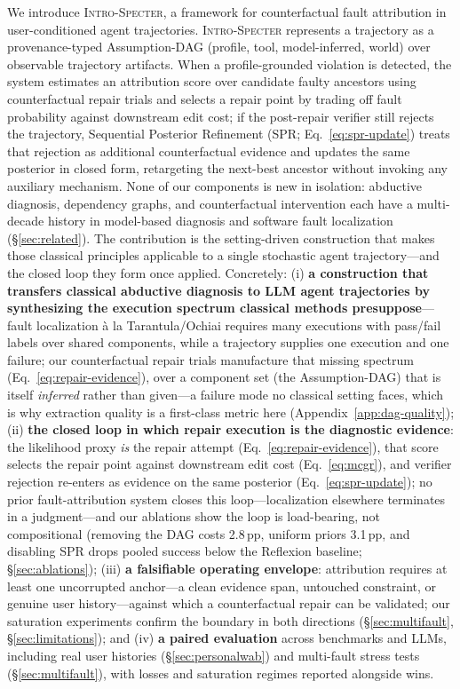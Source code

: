 \documentclass{article}
\newcommand{\method}{\textsc{Intro-Specter}\xspace}
\begin{document}
We introduce \method, a framework for counterfactual fault attribution in user-conditioned agent trajectories. \method represents a trajectory as a provenance-typed Assumption-DAG (profile, tool, model-inferred, world) over observable trajectory artifacts. When a profile-grounded violation is detected, the system estimates an attribution score over candidate faulty ancestors using counterfactual repair trials and selects a repair point by trading off fault probability against downstream edit cost; if the post-repair verifier still rejects the trajectory, Sequential Posterior Refinement (SPR; Eq.~\ref{eq:spr-update}) treats that rejection as additional counterfactual evidence and updates the same posterior in closed form, retargeting the next-best ancestor without invoking any auxiliary mechanism. None of our components is new in isolation: abductive diagnosis, dependency graphs, and counterfactual intervention each have a multi-decade history in model-based diagnosis and software fault localization (\S\ref{sec:related}). The contribution is the setting-driven construction that makes those classical principles applicable to a single stochastic agent trajectory---and the closed loop they form once applied. Concretely: (i) \textbf{a construction that transfers classical abductive diagnosis to LLM agent trajectories by synthesizing the execution spectrum classical methods presuppose}---fault localization \`a la Tarantula/Ochiai requires many executions with pass/fail labels over shared components, while a trajectory supplies one execution and one failure; our counterfactual repair trials manufacture that missing spectrum (Eq.~\ref{eq:repair-evidence}), over a component set (the Assumption-DAG) that is itself \emph{inferred} rather than given---a failure mode no classical setting faces, which is why extraction quality is a first-class metric here (Appendix~\ref{app:dag-quality}); (ii) \textbf{the closed loop in which repair execution is the diagnostic evidence}: the likelihood proxy \emph{is} the repair attempt (Eq.~\ref{eq:repair-evidence}), that score selects the repair point against downstream edit cost (Eq.~\ref{eq:mcgr}), and verifier rejection re-enters as evidence on the same posterior (Eq.~\ref{eq:spr-update}); no prior fault-attribution system closes this loop---localization elsewhere terminates in a judgment---and our ablations show the loop is load-bearing, not compositional (removing the DAG costs 2.8\,pp, uniform priors 3.1\,pp, and disabling SPR drops pooled success below the Reflexion baseline; \S\ref{sec:ablations}); (iii) \textbf{a falsifiable operating envelope}: attribution requires at least one uncorrupted anchor---a clean evidence span, untouched constraint, or genuine user history---against which a counterfactual repair can be validated; our saturation experiments confirm the boundary in both directions (\S\ref{sec:multifault}, \S\ref{sec:limitations}); and (iv) \textbf{a paired evaluation} across benchmarks and LLMs, including real user histories (\S\ref{sec:personalwab}) and multi-fault stress tests (\S\ref{sec:multifault}), with losses and saturation regimes reported alongside wins.
\end{document}
